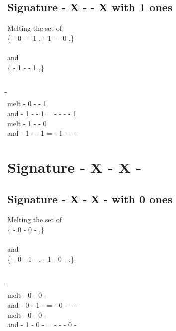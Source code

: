 \documentclass{article}
\begin{document}
\subsection{Signature - X - - X with 1 ones}
Melting the set of\\
\{ -  0  -  -  1 , -  1  -  -  0 ,\}\\\\
and\\
\{ -  1  -  -  1 ,\}\\\\
\begin{tabbing}
\hspace{3cm}\=\hspace{3cm}\=\hspace{3cm}\\[1cm]
melt\> -  0  -  -  1 \\
and\> -  1  -  -  1 \>
 =  -  -  -  -  1 \\[1mm]
melt\> -  1  -  -  0 \\
and\> -  1  -  -  1 \>
 =  -  1  -  -  - \\[1mm]
\end{tabbing}
\newpage
\section{Signature - X - X - }
\subsection{Signature - X - X - with 0 ones}
Melting the set of\\
\{ -  0  -  0  - ,\}\\\\
and\\
\{ -  0  -  1  - , -  1  -  0  - ,\}\\\\
\begin{tabbing}
\hspace{3cm}\=\hspace{3cm}\=\hspace{3cm}\\[1cm]
melt\> -  0  -  0  - \\
and\> -  0  -  1  - \>
 =  -  0  -  -  - \\[1mm]
melt\> -  0  -  0  - \\
and\> -  1  -  0  - \>
 =  -  -  -  0  - \\[1mm]
\end{tabbing}
\newpage
\end{document}
